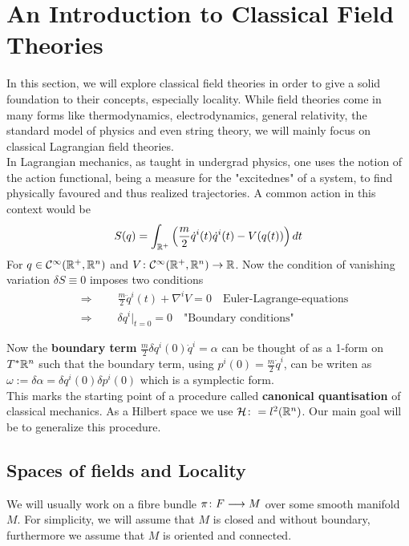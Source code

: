 \section{An Introduction to Classical Field Theories}
\label{sec:Classical_FT}
In this section, we will explore classical field theories  in order to give a solid foundation to their concepts, especially locality. While field theories come in many forms like thermodynamics, electrodynamics, general relativity, the standard model of physics and even string theory, we will mainly focus on classical Lagrangian field theories.\\

In Lagrangian mechanics, as taught in undergrad physics, one uses the notion of the action functional, being a measure for the "excitednes" of a system, to find physically favoured and thus realized trajectories. A common action in this context would be
$$ S(q) = \int_{\mathbb{R}^+} \left( \frac{m}{2} \dot q^i(t) \dot q^i(t) - V(q(t)) \right) dt $$
For $q\in \mathcal{C}^{\infty}(\mathbb{R}^+, \mathbb{R}^n)$ and $V\colon\mathcal{C}^{\infty}(\mathbb{R}^+, \mathbb{R}^n) \rightarrow \mathbb{R}$. Now the condition of vanishing variation $\delta S \equiv 0$ imposes two conditions
\begin{align}
  &\Rightarrow \quad \quad \frac{m}{2} \ddot q^i(t) + \nabla^i V = 0 \quad \text{Euler-Lagrange-equations}\\
  &\Rightarrow \quad \quad \delta q^i \Big|_{t=0} = 0 \quad \text{"Boundary conditions"}
\end{align}

Now the \textbf{boundary term} $\frac{m}{2}\delta q^i(0) \dot q^i = \alpha$ can be thought of as a 1-form on $T^*\mathbb{R}^n$ such that the boundary term, using $p^i(0) = \frac{m}{2} \dot q^i$, can be writen as $\omega := \delta \alpha = \delta q^i(0) \delta p^i(0)$ which is a symplectic form.\\

This marks the starting point of a procedure called \textbf{canonical quantisation} of classical mechanics. As a Hilbert space we use $\mathcal{H} \colon= l^2(\mathbb{R}^n)$. Our main goal will be to generalize this procedure.\\

\subsection{Spaces of fields and Locality}
We will usually work on a fibre bundle $\pi\colon F \longrightarrow M$ over some smooth manifold $M$. For simplicity, we will assume that $M$ is closed and without boundary, furthermore we assume that $M$ is oriented and connected.

